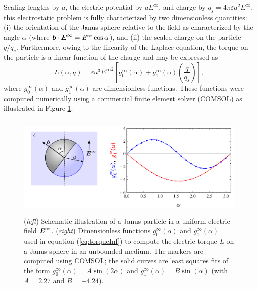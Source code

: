 \begin{appendices}
Scaling lengths by $a$, the electric potential by $a E^{\infty}$, and charge by $q_s=4\pi\varepsilon a^2 E^{\infty}$, this electrostatic problem is fully characterized by two dimensionless quantities: (i) the orientation of the Janus sphere relative to the field as characterized by the angle $\alpha$ (where $\boldsymbol{b}\cdot\boldsymbol{E}^{\infty} = E^{\infty} \cos\alpha$), and (ii) the scaled charge on the particle $q / q_s$.
Furthermore, owing to the linearity of the Laplace equation, the torque on the particle is a linear function of the charge and may be expressed as
\begin{equation}
    L(\alpha,q) = \varepsilon a^3 {E^{\infty}}^2 \left[g_0^{\infty}(\alpha) + g_1^{\infty}(\alpha) \left(\frac{q}{q_s}\right) \right], \label{eq:torqueInf}
\end{equation}
where $g_0^{\infty}(\alpha)$ and $g_1^{\infty}(\alpha)$ are dimensionless functions. These functions were computed numerically using a commercial finite element solver (COMSOL) as illustrated in Figure \ref{fig:TorqueFunctions}.

\begin{figure}[h]
    \centering
    \includegraphics[height=5cm]{figures/A1_Unbounded.pdf}
    \caption{(\emph{left}) Schematic illustration of a Janus particle in a uniform electric field $\boldsymbol{E}^{\infty}$.  (\emph{right}) Dimensionless functions $g_0^{\infty}(\alpha)$ and $g_1^{\infty}(\alpha)$ used in equation (\ref{eq:torqueInf}) to compute the electric torque $L$ on a Janus sphere in an unbounded medium. The markers are computed using COMSOL; the solid curves are least squares fits of the form $g_0^{\infty}(\alpha)=A\sin(2\alpha)$ and $g_1^{\infty}(\alpha)=B \sin(\alpha)$ (with $A=2.27$ and $B=-4.24$).}
    \label{fig:TorqueFunctions}
\end{figure}



\end{appendices}
